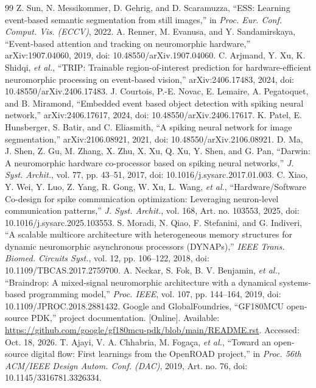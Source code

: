 \documentclass[preprint,12pt,number]{elsarticle}
\begin{document}
\begin{thebibliography}{99}
 Z. Sun, N. Messikommer, D. Gehrig, and D. Scaramuzza, ``ESS: Learning event-based semantic segmentation from still images,'' in \emph{Proc. Eur. Conf. Comput. Vis. (ECCV)}, 2022.
 A. Renner, M. Evanusa, and Y. Sandamirskaya, ``Event-based attention and tracking on neuromorphic hardware,'' arXiv:1907.04060, 2019, doi: 10.48550/arXiv.1907.04060.
 C. Arjmand, Y. Xu, K. Shidqi, \emph{et al.}, ``TRIP: Trainable region-of-interest prediction for hardware-efficient neuromorphic processing on event-based vision,'' arXiv:2406.17483, 2024, doi: 10.48550/arXiv.2406.17483.
 J. Courtois, P.-E. Novac, E. Lemaire, A. Pegatoquet, and B. Miramond, ``Embedded event based object detection with spiking neural network,'' arXiv:2406.17617, 2024, doi: 10.48550/arXiv.2406.17617.
 K. Patel, E. Hunsberger, S. Batir, and C. Eliasmith, ``A spiking neural network for image segmentation,'' arXiv:2106.08921, 2021, doi: 10.48550/arXiv.2106.08921.
 D. Ma, J. Shen, Z. Gu, M. Zhang, X. Zhu, X. Xu, Q. Xu, Y. Shen, and G. Pan, ``Darwin: A neuromorphic hardware co-processor based on spiking neural networks,'' \emph{J. Syst. Archit.}, vol. 77, pp. 43--51, 2017, doi: 10.1016/j.sysarc.2017.01.003.
 C. Xiao, Y. Wei, Y. Luo, Z. Yang, R. Gong, W. Xu, L. Wang, \emph{et al.}, ``Hardware/Software Co-design for spike communication optimization: Leveraging neuron-level communication patterns,'' \emph{J. Syst. Archit.}, vol. 168, Art. no. 103553, 2025, doi: 10.1016/j.sysarc.2025.103553.
 S. Moradi, N. Qiao, F. Stefanini, and G. Indiveri, ``A scalable multicore architecture with heterogeneous memory structures for dynamic neuromorphic asynchronous processors (DYNAPs),'' \emph{IEEE Trans. Biomed. Circuits Syst.}, vol. 12, pp. 106--122, 2018, doi: 10.1109/TBCAS.2017.2759700.
 A. Neckar, S. Fok, B. V. Benjamin, \emph{et al.}, ``Braindrop: A mixed-signal neuromorphic architecture with a dynamical systems-based programming model,'' \emph{Proc. IEEE}, vol. 107, pp. 144--164, 2019, doi: 10.1109/JPROC.2018.2881432.
 Google and GlobalFoundries, ``GF180MCU open-source PDK,'' project documentation. [Online]. Available: \url{https://github.com/google/gf180mcu-pdk/blob/main/README.rst}. Accessed: Oct. 18, 2026.
 T. Ajayi, V. A. Chhabria, M. Foga\c{c}a, \emph{et al.}, ``Toward an open-source digital flow: First learnings from the OpenROAD project,'' in \emph{Proc. 56th ACM/IEEE Design Autom. Conf. (DAC)}, 2019, Art. no. 76, doi: 10.1145/3316781.3326334.

\end{thebibliography}
\end{document}
